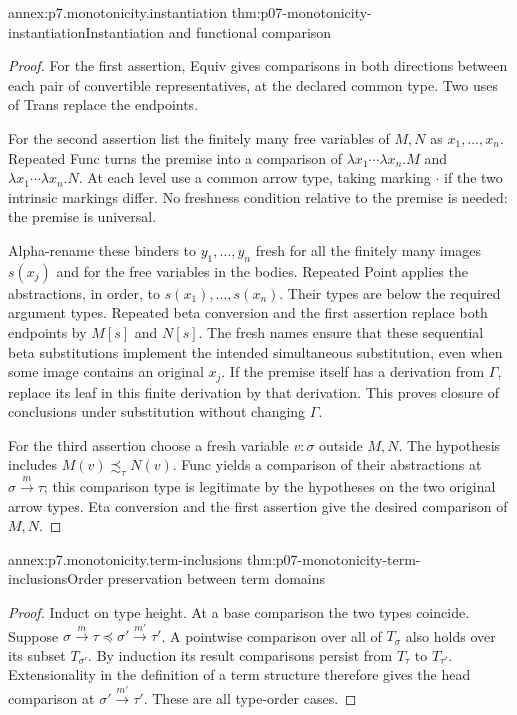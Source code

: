 \begin{annexitem}{annex:p7.monotonicity.instantiation}
 {thm:p07-monotonicity-instantiation}{Instantiation and functional comparison}
\begin{proof}
For the first assertion, Equiv gives comparisons in both directions between
each pair of convertible representatives, at the declared common type.
Two uses of Trans replace the endpoints.

For the second assertion list the finitely many free variables of \(M,N\)
as \(x_1,\ldots,x_n\). Repeated Func turns the premise into a comparison
of \(\lambda x_1\cdots\lambda x_n.M\) and
\(\lambda x_1\cdots\lambda x_n.N\).
At each level use a common arrow type, taking marking \(\cdot\) if the
two intrinsic markings differ. No freshness condition relative to the
premise is needed: the premise is universal.

Alpha-rename these binders to \(y_1,\ldots,y_n\) fresh for all the
finitely many images \(s(x_j)\) and for the free variables in the bodies.
Repeated Point applies the abstractions, in order, to
\(s(x_1),\ldots,s(x_n)\). Their types are below the required argument
types. Repeated beta conversion and the first assertion replace both
endpoints by \(M[s]\) and \(N[s]\). The fresh names ensure that these
sequential beta substitutions implement the intended simultaneous
substitution, even when some image contains an original \(x_j\).
If the premise itself has a derivation from \(\Gamma\), replace its leaf
in this finite derivation by that derivation. This proves closure of
conclusions under substitution without changing \(\Gamma\).

For the third assertion choose a fresh variable \(v:\sigma\) outside
\(M,N\). The hypothesis includes
\(M(v)\precsim_\tau N(v)\). Func yields a comparison of their abstractions
at \(\sigma\xrightarrow m\tau\); this comparison type is legitimate by
the hypotheses on the two original arrow types. Eta conversion and the
first assertion give the desired comparison of \(M,N\).
\end{proof}
\end{annexitem}


\begin{annexitem}{annex:p7.monotonicity.term-inclusions}
 {thm:p07-monotonicity-term-inclusions}{Order preservation between term domains}
\begin{proof}
Induct on type height. At a base comparison the two types coincide.
Suppose
\(\sigma\xrightarrow m\tau\preceq
  \sigma'\xrightarrow{m'}\tau'\).
A pointwise comparison over all of \(T_\sigma\) also holds over its
subset \(T_{\sigma'}\). By induction its result comparisons persist from
\(T_\tau\) to \(T_{\tau'}\). Extensionality in the definition of a term
structure therefore gives the head comparison at
\(\sigma'\xrightarrow{m'}\tau'\). These are all type-order cases.
\end{proof}
\end{annexitem}

